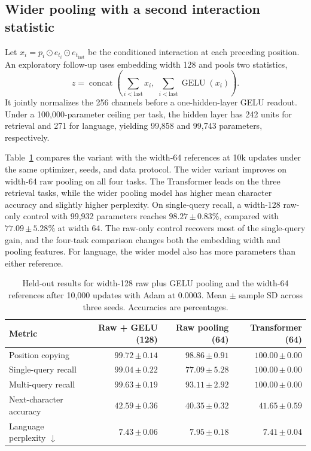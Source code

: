 \documentclass[11pt]{article}
\newcommand{\sd}[2]{#1\,{\scriptstyle\pm\,#2}}
\begin{document}
\subsection{Wider pooling with a second interaction statistic}
\label{sec:raw-gelu}
Let \(x_i=p_i\odot e_{t_i}\odot e_{t_{\mathrm{last}}}\) be the conditioned interaction at each preceding position. An exploratory follow-up uses embedding width 128 and pools two statistics,
\[
    z=\operatorname{concat}\!\left(
        \sum_{i<\mathrm{last}}x_i,\;
        \sum_{i<\mathrm{last}}\operatorname{GELU}(x_i)
    \right).
\]
It jointly normalizes the 256 channels before a one-hidden-layer GELU readout. Under a 100,000-parameter ceiling per task, the hidden layer has 242 units for retrieval and 271 for language, yielding 99,858 and 99,743 parameters, respectively.

Table~\ref{tab:wide-pooling} compares the variant with the width-64 references at 10k updates under the same optimizer, seeds, and data protocol. The wider variant improves on width-64 raw pooling on all four tasks. The Transformer leads on the three retrieval tasks, while the wider pooling model has higher mean character accuracy and slightly higher perplexity. On single-query recall, a width-128 raw-only control with 99,932 parameters reaches \(\sd{98.27}{0.83}\%\), compared with \(\sd{77.09}{5.28}\%\) at width 64. The raw-only control recovers most of the single-query gain, and the four-task comparison changes both the embedding width and pooling features. For language, the wider model also has more parameters than either reference.

\begin{table}[htbp]
\centering\small
\caption{Held-out results for width-128 raw plus GELU pooling and the width-64 references after 10,000 updates with Adam at 0.0003. Mean \(\pm\) sample SD across three seeds. Accuracies are percentages.}
\label{tab:wide-pooling}
\begin{tabular}{lrrr}
\toprule
Metric & Raw + GELU (128) & Raw pooling (64) & Transformer (64)\\
\midrule
Position copying & \(\sd{99.72}{0.14}\) & \(\sd{98.86}{0.91}\) & \(\sd{100.00}{0.00}\)\\
Single-query recall & \(\sd{99.04}{0.22}\) & \(\sd{77.09}{5.28}\) & \(\sd{100.00}{0.00}\)\\
Multi-query recall & \(\sd{99.63}{0.19}\) & \(\sd{93.11}{2.92}\) & \(\sd{100.00}{0.00}\)\\
Next-character accuracy & \(\sd{42.59}{0.36}\) & \(\sd{40.35}{0.32}\) & \(\sd{41.65}{0.59}\)\\
Language perplexity \(\downarrow\) & \(\sd{7.43}{0.06}\) & \(\sd{7.95}{0.18}\) & \(\sd{7.41}{0.04}\)\\
\bottomrule
\end{tabular}
\end{table}
\end{document}
